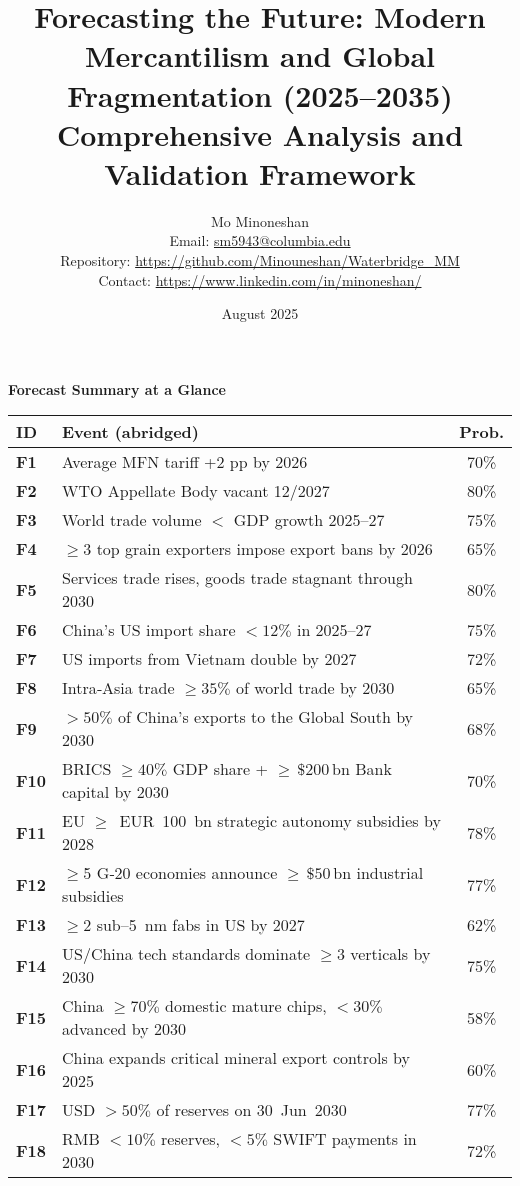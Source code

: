 \documentclass{article}
\title{\textbf{Forecasting the Future: Modern Mercantilism and Global Fragmentation (2025--2035)}\\\Large Comprehensive Analysis and Validation Framework}
\author{Mo Minoneshan\\
\small Email: \href{mailto:sm5943@columbia.edu}{sm5943@columbia.edu}\\
\small Repository: \url{https://github.com/Minouneshan/Waterbridge\_MM}\\
\small Contact: \url{https://www.linkedin.com/in/minoneshan/}}
\date{August 2025}
\newenvironment{landscapetable}{\begin{landscape}\small}{\end{landscape}}
\begin{document}
\maketitle

\tableofcontents


\begin{landscapetable}
\captionsetup{type=table}
\caption*{\bfseries Forecast Summary at a Glance}
\begin{tabularx}{\textwidth}{>{\bfseries}lXc}
\toprule
ID & Event (abridged) & Prob.\\
\midrule
F1 & Average MFN tariff +2 pp by 2026 & 70\%\\
F2 & WTO Appellate Body vacant 12/2027 & 80\%\\
F3 & World trade volume $<$ GDP growth 2025–27 & 75\%\\
F4 & $\geq$3 top grain exporters impose export bans by 2026 & 65\%\\
F5 & Services trade rises, goods trade stagnant through 2030 & 80\%\\
F6 & China’s US import share $<12\%$ in 2025–27 & 75\%\\
F7 & US imports from Vietnam double by 2027 & 72\%\\
F8 & Intra‑Asia trade $\geq 35\%$ of world trade by 2030 & 65\%\\
F9 & $>50\%$ of China’s exports to the Global South by 2030 & 68\%\\
F10 & BRICS $\geq 40\%$ GDP share + $\geq\,\$200\,\mathrm{bn}$ Bank capital by 2030 & 70\%\\
F11 & EU $\geq$ EUR 100 bn strategic autonomy subsidies by 2028 & 78\%\\
F12 & $\geq$5 G‑20 economies announce $\geq\,\$50\,\mathrm{bn}$ industrial subsidies & 77\%\\
F13 & $\geq$2 sub–5 nm fabs in US by 2027 & 62\%\\
F14 & US/China tech standards dominate $\geq$3 verticals by 2030 & 75\%\\
F15 & China $\geq 70\%$ domestic mature chips, $<30\%$ advanced by 2030 & 58\%\\
F16 & China expands critical mineral export controls by 2025 & 60\%\\
F17 & USD $>50\%$ of reserves on 30 Jun 2030 & 77\%\\
F18 & RMB $<10\%$ reserves, $<5\%$ SWIFT payments in 2030 & 72\%\\

\end{tabularx}
\end{landscapetable}
\end{document}

